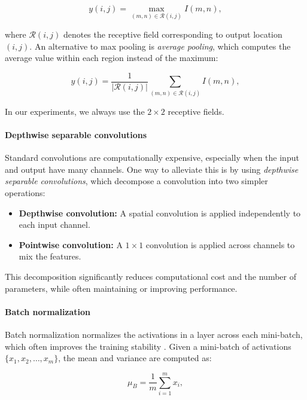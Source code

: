 \begin{equation} 
	\label{eq:max-pooling} 
	y(i,j) = \max_{(m,n) \in \mathcal{R}(i,j)} I(m,n), 
\end{equation}

where $\mathcal{R}(i,j)$ denotes the receptive field corresponding to output location $(i,j)$. An alternative to max pooling is \emph{average pooling}, which computes the average value within each region instead of the maximum:

\begin{equation}
	\label{eq:avg-pooling}
	y(i,j) = \frac{1}{|\mathcal{R}(i,j)|} \sum_{(m,n) \in \mathcal{R}(i,j)} I(m,n),
\end{equation}


In our experiments, we always use the $2\times2$ receptive fields. 

\paragraph{Depthwise separable convolutions}

Standard convolutions are computationally expensive, especially when the input and output have many channels. One way to alleviate this is by using \emph{depthwise separable convolutions}, which decompose a convolution into two simpler operations:

\begin{itemize} 
	\item \textbf{Depthwise convolution:} A spatial convolution is applied independently to each input channel. 
	\item \textbf{Pointwise convolution:} A $1\times1$ convolution is applied across channels to mix the features. 
\end{itemize}

This decomposition significantly reduces computational cost and the number of parameters, while often maintaining or  improving performance.

\paragraph{Batch normalization}

Batch normalization normalizes the activations in a layer across each mini-batch, which often improves the training stability \cite{ioffe2015batch}. Given a mini-batch of activations $\{x_1, x_2, \ldots, x_m\}$, the mean and variance are computed as:

\begin{equation}
    \mu_B = \frac{1}{m} \sum_{i=1}^{m} x_i,
\end{equation}

